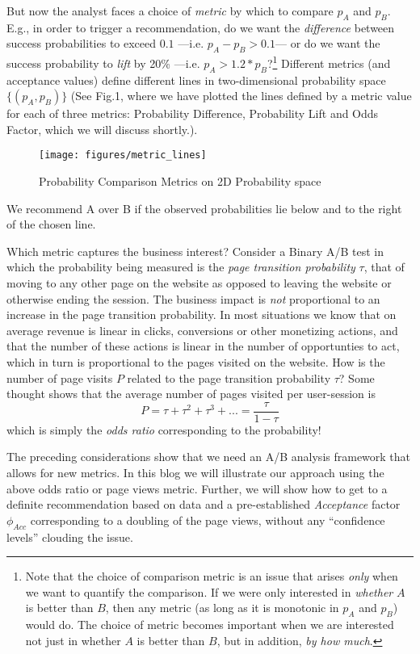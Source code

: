 \documentclass[letterpaper,12pt]{article}
\newcommand{\bdm}{\begin{displaymath}} %
\newcommand{\edm}{\end{displaymath}} %
\begin{document}
But now the analyst faces a choice of {\em metric} by which to compare
\(p_A\) and \(p_B\). E.g., in order to trigger a recommendation, do we
want the {\em difference} between success probabilities to exceed
\(0.1\) ---i.e. \(p_A-p_B>0.1\)--- or do we want the success
probability to {\em lift} by 20\% ---i.e. \(p_A >
1.2*p_B\)?\footnote{Note that the choice of comparison metric is an
  issue that arises {\em only} when we want to quantify the
  comparison. If we were only interested in {\em whether} \(A\) is
  better than \(B\), then any metric (as long as it is monotonic in
  \(p_A\) and \(p_B\)) would do. The choice of metric becomes
  important when we are interested not just in whether \(A\) is better
  than \(B\), but in addition, {\em by how much}.}
Different metrics (and acceptance values) define different lines in
two-dimensional probability space \(\{(p_A, p_B)\}\) (See Fig.1, where
we have plotted the lines defined by a metric value for each of three
metrics: Probability Difference, Probability Lift and Odds Factor,
which we will discuss shortly.).
\begin{figure}[ht!]
\centering
\texttt{[image: figures/metric\_lines]}
\caption{Probability Comparison Metrics on 2D Probability
  space \label{fig:metric_lines}}
\end{figure}
We recommend A over B if the
observed probabilities lie below and to the right of the chosen line.

Which metric captures the business interest?  Consider a Binary A/B
test in which the probability being measured is the {\em page
  transition probability} \(\tau\), that of moving to any other page
on the website as opposed to leaving the website or otherwise ending
the session. The business impact is {\em not} proportional to an
increase in the page transition probability. In most situations we
know that on average revenue is linear in clicks, conversions or other
monetizing actions, and that the number of these actions is linear in
the number of opportunties to act, which in turn is proportional
to the pages visited on the website. How is the number of page visits
\(P\) related to the page transition probability \(\tau\)? Some
thought shows that the average number of pages visited per
user-session is
\bdm
P= \tau + \tau^2 + \tau^3 + ...=
\frac{\tau}{1-\tau}
\edm
which is simply the {\em odds ratio} corresponding to the probability!

The preceding considerations show that we need an A/B analysis
framework that allows for new metrics. In this blog we will illustrate
our approach using the above odds ratio or page views metric. Further,
we will show how to get to a definite recommendation based on data and
a pre-established {\em Acceptance} factor \(\phi_{Acc}\) corresponding
to a doubling of the page views, without any ``confidence levels''
clouding the issue.
\end{document}
